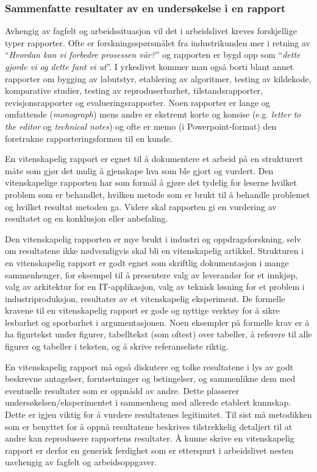 \documentclass{article}
\begin{document}
\subsubsection{Sammenfatte resultater av en undersøkelse i en rapport}
Avhengig av fagfelt og arbeidssituasjon vil det i arbeidslivet kreves forskjellige typer rapporter. Ofte er forskningsspørsmålet fra industrikunden mer i retning av ``\emph{Hvordan kan vi forbedre prosessen vår?}'' og rapporten er bygd opp som ``\emph{dette gjorde vi og dette fant vi ut}''. I yrkeslivet kommer man også borti blant annet rapporter om bygging av labutstyr, etablering av algoritmer, testing av kildekode, komparative studier, testing av reproduserbarhet, tilstandsrapporter, revisjonsrapporter og evalueringsrapporter. Noen rapporter er lange og omfattende (\emph{monograph}) mens andre er ekstremt korte og konsise (e.g. \emph{letter to the editor} og \emph{technical notes}) og ofte er memo (i Powerpoint-format) den foretrukne rapporteringsformen til en kunde.

En vitenskapelig rapport er egnet til å dokumentere et arbeid på en strukturert måte som gjør det mulig å gjenskape hva som ble gjort og vurdert.
Den vitenskapelige rapporten har som formål å gjøre det tydelig for leserne hvilket problem som er behandlet, hvilken metode som er brukt til å behandle problemet og hvilket resultat metoden ga.
Videre skal rapporten gi en vurdering av resultatet og en konklusjon eller anbefaling.

Den vitenskapelig rapporten er mye brukt i industri og oppdragsforskning, selv om resultatene ikke nødvendigvis skal bli en vitenskapelig artikkel.
Strukturen i en vitenskapelig rapport er godt egnet som skriftlig dokumentasjon i mange sammenhenger, for eksempel til å presentere valg av leverandør for et innkjøp, valg av arkitektur for en IT-applikasjon, valg av teknisk løsning for et problem i industriproduksjon, resultater av et vitenskapelig eksperiment.
De formelle kravene til en vitenskapelig rapport er gode og nyttige verktøy for å sikre lesbarhet og sporbarhet i argumentasjonen.
Noen eksempler på formelle krav er å ha figurtekst under figurer, tabelltekst (som oftest) over tabeller, å referere til alle figurer og tabeller i teksten, og å skrive referanseliste riktig.

En vitenskapelig rapport må også diskutere og tolke resultatene i lys av godt beskrevne antagelser, forutsetninger og betingelser, og sammenlikne dem med eventuelle resultater som er oppnådd av andre.
Dette plasserer undersøkelsen/eksperimentet i sammenheng med allerede etablert kunnskap.
Dette er igjen viktig for å vurdere resultatenes legitimitet.
Til sist må metodikken som er benyttet for å oppnå resultatene beskrives tilstrekkelig detaljert til at andre kan reprodusere rapportens resultater.
Å kunne skrive en vitenskapelig rapport er derfor en generisk ferdighet som er etterspurt i arbeidslivet nesten uavhengig av fagfelt og arbeidsoppgaver.
\end{document}

